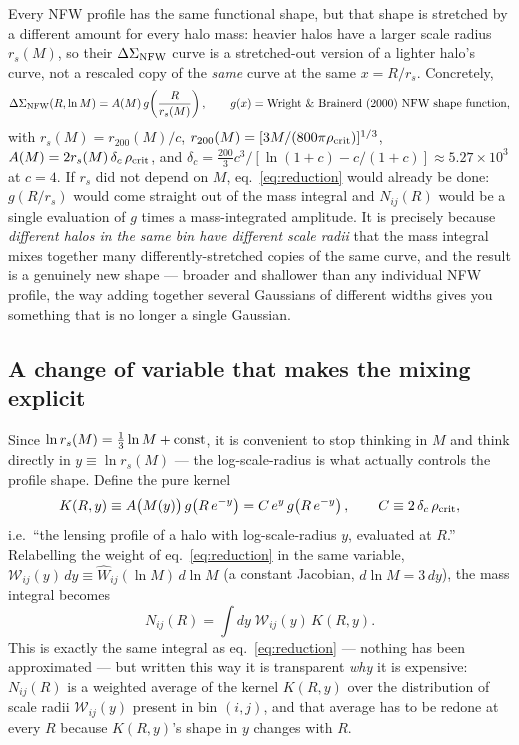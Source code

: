 \documentclass[a4paper, 11pt]{article}
\newcommand{\lnM}{\ln M}
\newcommand{\rs}{r_s}
\newcommand{\DSnfw}{\Delta\Sigma_{\rm NFW}}
\newcommand{\Wcal}{\mathcal{W}}
\begin{document}
Every NFW profile has the same functional shape, but that shape is
stretched by a different amount for every halo mass: heavier
halos have a larger scale radius $\rs(M)$, so their $\DSnfw$ curve
is a stretched-out version of a lighter halo's curve, not a
rescaled copy of the \emph{same} curve at the same $x=R/\rs$.
Concretely,
\begin{equation}
\DSnfw(R,\lnM) = A(M)\, g\!\left(\frac{R}{\rs(M)}\right),
\qquad
g(x) = \text{Wright \& Brainerd (2000) NFW shape function},
\label{eq:nfw_shape}
\end{equation}
with $\rs(M) = r_{200}(M)/c$, $r_{200}(M) = [3M/(800\pi\rho_{\rm
crit})]^{1/3}$, $A(M) = 2\rs(M)\,\delta_c\,\rho_{\rm crit}$, and
$\delta_c = \tfrac{200}{3}c^3/[\ln(1+c)-c/(1+c)]\approx5.27\times10^3$
at $c=4$. If $\rs$ did not depend on $M$, eq.~\eqref{eq:reduction}
would already be done: $g(R/\rs)$ would come straight out of the
mass integral and $N_{ij}(R)$ would be a single evaluation of $g$
times a mass-integrated amplitude. It is precisely because
\emph{different halos in the same bin have different scale radii}
that the mass integral mixes together many differently-stretched
copies of the same curve, and the result is a genuinely new shape
--- broader and shallower than any individual NFW profile, the way
adding together several Gaussians of different widths gives you
something that is no longer a single Gaussian.

\subsection{A change of variable that makes the mixing explicit}

Since $\ln\rs(M) = \tfrac13\lnM + {\rm const}$, it is convenient to
stop thinking in $M$ and think directly in $y\equiv\ln\rs(M)$ ---
the log-scale-radius is what actually controls the profile shape.
Define the pure kernel
\begin{equation}
K(R,y) \equiv A\big(M(y)\big)\, g\!\left(R\,e^{-y}\right)
= C\,e^{y}\, g\!\left(R\,e^{-y}\right),
\qquad C \equiv 2\,\delta_c\,\rho_{\rm crit},
\label{eq:kernel}
\end{equation}
i.e.\ ``the lensing profile of a halo with log-scale-radius $y$,
evaluated at $R$.'' Relabelling the weight of eq.~\eqref{eq:reduction}
in the same variable, $\Wcal_{ij}(y)\,dy \equiv \widehat
W_{ij}(\lnM)\,d\lnM$ (a constant Jacobian, $d\lnM=3\,dy$), the
mass integral becomes
\begin{equation}
N_{ij}(R) = \int\! dy\; \Wcal_{ij}(y)\, K(R,y).
\label{eq:reduced_1d}
\end{equation}
This is exactly the same integral as eq.~\eqref{eq:reduction} ---
nothing has been approximated --- but written this way it is
transparent \emph{why} it is expensive: $N_{ij}(R)$ is a weighted
average of the kernel $K(R,y)$ over the distribution of
scale radii $\Wcal_{ij}(y)$ present in bin $(i,j)$, and that
average has to be redone at every $R$ because $K(R,y)$'s shape in
$y$ changes with $R$.
\end{document}
